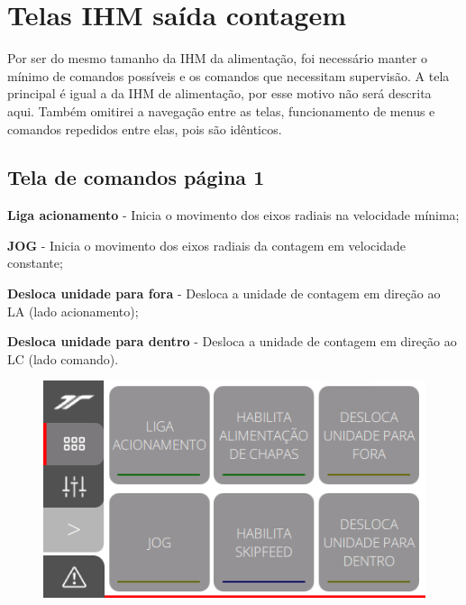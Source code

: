 \thispagestyle{fancy}
\vspace*{40 pt}
\section{Telas IHM saída contagem}
 Por ser do mesmo tamanho da IHM da alimentação, foi necessário manter o mínimo de comandos possíveis e os comandos que necessitam supervisão.
 A tela principal é igual a da IHM de alimentação, por esse motivo não será descrita aqui. Também omitirei a navegação entre as telas, funcionamento de menus
 e comandos repedidos entre elas, pois são idênticos.

\subsection{\small{Tela de comandos página 1}}


\begin{commandsInCount}
  \item[\ding{\dingNumber}] \textbf{Liga acionamento} - Inicia o movimento dos eixos radiais na velocidade mínima;
  \item[\ding{\dingNumber}] \textbf{JOG} - Inicia o movimento dos eixos radiais da contagem em velocidade constante;
  \item[\ding{\dingNumber}] \textbf{Desloca unidade para fora} - Desloca a unidade de contagem em direção ao LA (lado acionamento);
  \item[\ding{\dingNumber}] \textbf{Desloca unidade para dentro} - Desloca a unidade de contagem em direção ao LC (lado comando).
\end{commandsInCount}

\vspace*{\fill}
\begin{figure}[h]
  \centering
  \includegraphics{src/imagesFlexo/12-IHMCNT/e-2.png}
\end{figure}
\vspace*{\fill}

